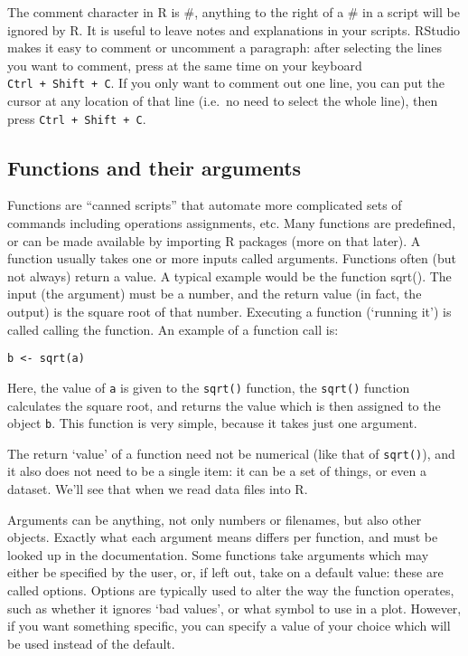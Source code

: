 \documentclass[]{book}
\begin{document}
The comment character in R is \#, anything to the right of a \# in a
script will be ignored by R. It is useful to leave notes and
explanations in your scripts. RStudio makes it easy to comment or
uncomment a paragraph: after selecting the lines you want to comment,
press at the same time on your keyboard \texttt{Ctrl\ +\ Shift\ +\ C}.
If you only want to comment out one line, you can put the cursor at any
location of that line (i.e.~no need to select the whole line), then
press \texttt{Ctrl\ +\ Shift\ +\ C}.

\subsection{Functions and their
arguments}\label{functions-and-their-arguments}

Functions are ``canned scripts'' that automate more complicated sets of
commands including operations assignments, etc. Many functions are
predefined, or can be made available by importing R packages (more on
that later). A function usually takes one or more inputs called
arguments. Functions often (but not always) return a value. A typical
example would be the function sqrt(). The input (the argument) must be a
number, and the return value (in fact, the output) is the square root of
that number. Executing a function (`running it') is called calling the
function. An example of a function call is:

\begin{verbatim}
b <- sqrt(a)
\end{verbatim}

Here, the value of \texttt{a} is given to the \texttt{sqrt()} function,
the \texttt{sqrt()} function calculates the square root, and returns the
value which is then assigned to the object \texttt{b}. This function is
very simple, because it takes just one argument.

The return `value' of a function need not be numerical (like that of
\texttt{sqrt()}), and it also does not need to be a single item: it can
be a set of things, or even a dataset. We'll see that when we read data
files into R.

Arguments can be anything, not only numbers or filenames, but also other
objects. Exactly what each argument means differs per function, and must
be looked up in the documentation. Some functions take arguments which
may either be specified by the user, or, if left out, take on a default
value: these are called options. Options are typically used to alter the
way the function operates, such as whether it ignores `bad values', or
what symbol to use in a plot. However, if you want something specific,
you can specify a value of your choice which will be used instead of the
default.
\end{document}

